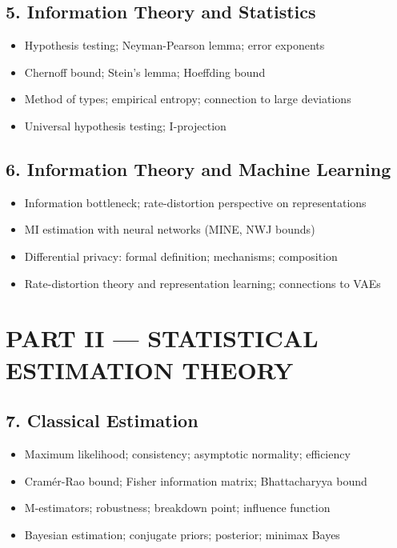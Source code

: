 \subsection{5. Information Theory and Statistics}
\begin{itemize}
\item Hypothesis testing; Neyman-Pearson lemma; error exponents
\item Chernoff bound; Stein's lemma; Hoeffding bound
\item Method of types; empirical entropy; connection to large deviations
\item Universal hypothesis testing; I-projection
\end{itemize}

\subsection{6. Information Theory and Machine Learning}
\begin{itemize}
\item Information bottleneck; rate-distortion perspective on representations
\item MI estimation with neural networks (MINE, NWJ bounds)
\item Differential privacy: formal definition; mechanisms; composition
\item Rate-distortion theory and representation learning; connections to VAEs
\end{itemize}

\section{PART II --- STATISTICAL ESTIMATION THEORY}

\subsection{7. Classical Estimation}
\begin{itemize}
\item Maximum likelihood; consistency; asymptotic normality; efficiency
\item Cram\'er-Rao bound; Fisher information matrix; Bhattacharyya bound
\item M-estimators; robustness; breakdown point; influence function
\item Bayesian estimation; conjugate priors; posterior; minimax Bayes
\end{itemize}

